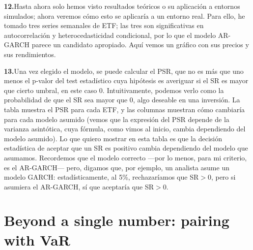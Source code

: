 \documentclass[11pt,a4paper]{article}
\newcommand{\seccionrule}{\vspace{-0.6em}{\color{accentblue}\hrule height 0.8pt}\vspace{0.8em}}
\newcommand{\diapo}[2]{%
  \par\medskip\noindent%
  \textbf{\textcolor{accentblue}{#1.}}\enspace #2\par\smallskip}
\begin{document}
\diapo{12}{Hasta ahora solo hemos visto resultados teóricos o su
aplicación a entornos simulados; ahora veremos cómo esto se aplicaría a
un entorno real. Para ello, he tomado tres series semanales de ETF; las
tres son significativas en autocorrelación y heterocedasticidad
condicional, por lo que el modelo AR-GARCH parece un candidato apropiado.
Aquí vemos un gráfico con sus precios y sus rendimientos.}

\diapo{13}{Una vez elegido el modelo, se puede calcular el PSR, que no es
más que uno menos el p-valor del test estadístico cuya hipótesis es
averiguar si el SR es mayor que cierto umbral, en este caso 0.
Intuitivamente, podemos verlo como la probabilidad de que el SR sea mayor
que 0, algo deseable en una inversión.
La tabla muestra el PSR para cada ETF, y las columnas muestran cómo
cambiaría para cada modelo asumido (vemos que la expresión del PSR
depende de la varianza asintótica, cuya fórmula, como vimos al inicio,
cambia dependiendo del modelo asumido).
Lo que quiero mostrar en esta tabla es que la decisión estadística de
aceptar que un SR es positivo cambia dependiendo del modelo que
asumamos. Recordemos que el modelo correcto —por lo menos, para mi
criterio, es el AR-GARCH— pero, digamos que, por ejemplo, un analista
asume un modelo GARCH: estadísticamente, al 5\%, rechazaríamos que
SR$>$0, pero si asumiera el AR-GARCH, sí que aceptaría que SR$>$0.}

\vspace{0.4em}
\seccionrule

\section*{Beyond a single number: pairing with VaR}
\end{document}
